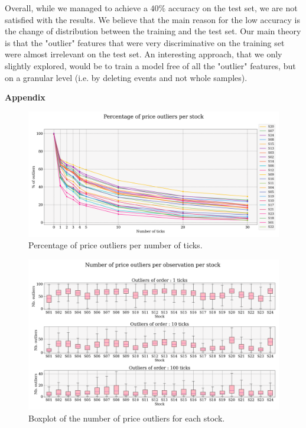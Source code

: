 \documentclass[switch, 11pt]{article}
\begin{document}
\begin{multicols}{2}
    Overall, while we managed to achieve a $40\%$ accuracy on the test set, we are not satisfied with the results. We believe that the main reason for the low accuracy is the change of distribution between the training and the test set. Our main theory is that the "outlier" features that were very discriminative on the training set were almost irrelevant on the test set. An interesting approach, that we only slightly explored, would be to train a model free of all the "outlier" features, but on a granular level (i.e. by deleting events and not whole samples).

    \newpage
    

\end{multicols}

\newpage
\appendix
\begin{center}
    {\Large \bfseries Appendix} \\
\end{center}
\begin{figure}[H]
    \centering
    \includegraphics[width=\columnwidth]{figures/percentage_outliers_per_stock.png}
    \caption{Percentage of price outliers per number of ticks.}
    \label{fig:nb_outliers}
\end{figure}

\begin{figure}[H]
    \centering
    \includegraphics[width=\columnwidth]{figures/boxplot_nb_outliers.png}
    \caption{Boxplot of the number of price outliers for each stock.}
    \label{fig:boxplot_outliers}
\end{figure}
\end{document}
